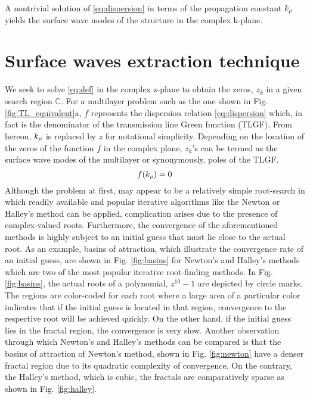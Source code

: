 A nontrivial solution of \eqref{eq:dispersion} in terms of the propagation constant $k_{\rho}$ yields the surface wave modes of the structure in the complex k-plane.
\section{Surface waves extraction technique}
%
We seek to solve \eqref{eq:def} in the complex z-plane to obtain the zeros, $z_k$ in a given search region $\mathbb{C}$. For a multilayer problem such as the one shown in Fig. \ref{fig:TL_equivalent}a, $f$ represents the dispersion relation \eqref{eq:dispersion} which, in fact is the denominator of the  transmission line Green function (TLGF). From hereon, $k_{\rho}$ is replaced by $z$ for notational simplicity. Depending on the location of the zeros of the function $f$ in the complex plane, $z_k$'s can be termed as the surface wave modes of the multilayer or synonymously, poles of the TLGF.
%
\begin{equation}
  f(k_{\rho}) = 0
  \label{eq:def}
\end{equation}
%
Although the problem at first, may appear to be a relatively simple root-search in which readily available and popular iterative algorithms like the Newton or Halley's method can be applied, complication arises due to the presence of complex-valued roots. Furthermore, the convergence of the aforementioned methods is highly subject to an initial guess that must lie close to the actual root. As an example, basins of attraction, which illustrate the convergence rate of an initial guess, are shown in Fig. \ref{fig:basins} for Newton's and Halley's methods which are two of the most popular iterative root-finding methods. In Fig. \ref{fig:basins}, the actual roots of a polynomial, $z^{10}-1$ are depicted by circle marks. The regions are color-coded for each root where a large area of a particular color indicates that if the initial guess is located in that region, convergence to the respective root will be achieved quickly. On the other hand, if the initial guess lies in the fractal region, the convergence is very slow. Another observation through which Newton's and Halley's methods can be compared is that the basins of attraction of Newton's method,
shown in Fig. \ref{fig:newton} have a denser fractal region due to its quadratic complexity of convergence. On the contrary, the Halley's method, which is cubic, the fractals are comparatively sparse as shown in Fig. \ref{fig:halley}.


